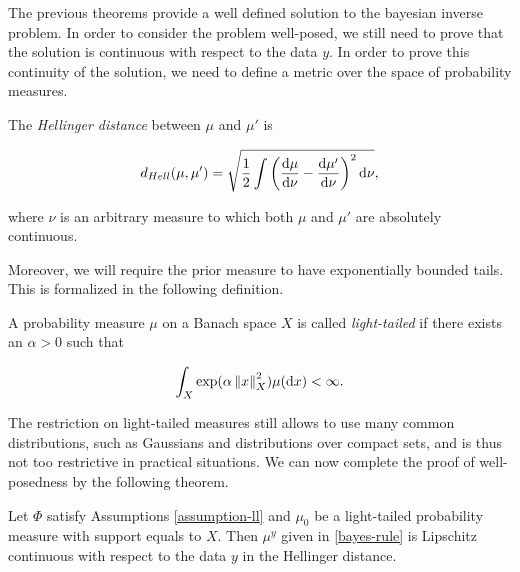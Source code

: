 The previous theorems provide a well defined solution to the bayesian inverse problem. In order to consider the problem well-posed, we still need to prove that the solution is continuous with respect to the data $y$. In order to prove this continuity of the solution, we need to define a metric over the space of probability measures.

\begin{definition} The \textit{Hellinger distance} between $\mu$ and $\mu'$ is

  \begin{equation*}
    d_{Hell}(\mu, \mu') = \sqrt{\frac12\int\left(\frac{\text{d} \mu}{\text{d} \nu} - \frac{\text{d} \mu'}{\text{d} \nu}\right)^2\text{d} \nu},
  \end{equation*}

  where $\nu$ is an arbitrary measure to which both $\mu$ and $\mu'$ are absolutely continuous.
\end{definition}

Moreover, we will require the prior measure to have exponentially bounded tails. This is formalized in the following definition.

\begin{definition}
  A probability measure $\mu$ on a Banach space $X$ is called \textit{light-tailed} if there exists an $\alpha > 0$ such that

  \begin{equation*}
    \int_X\exp(\alpha\left\lVert x\right\rVert^2_X)\mu(\text{d} x) < \infty.
  \end{equation*}
\end{definition}

The restriction on light-tailed measures still allows to use many common distributions, such as Gaussians and distributions over compact sets, and is thus not too restrictive in practical situations. We can now complete the proof of well-posedness by the following theorem.

\begin{theorem}
  Let $\Phi$ satisfy Assumptions \ref{assumption-ll} and $\mu_0$ be a light-tailed probability measure with support equals to $X$. Then $\mu^y$ given in \ref{bayes-rule} is Lipschitz continuous with respect to the data $y$ in the Hellinger distance.
\end{theorem}

